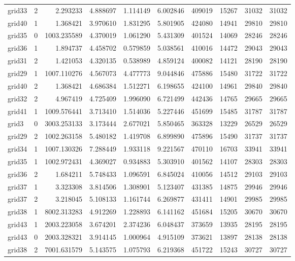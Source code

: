 \begin{longtable}{|l|r|r|r|r|r|r|r|r|r|}
grid33 & 2 & 2.293233 & 4.888697 & 1.114149 & 6.002846 & 409019 & 15267 & 31032 & 31032 \\
grid40 & 1 & 1.368421 & 3.970610 & 1.831295 & 5.801905 & 424080 & 14941 & 29810 & 29810 \\
grid35 & 0 & 1003.235589 & 4.370019 & 1.061290 & 5.431309 & 401524 & 14069 & 28246 & 28246 \\
grid36 & 1 & 1.894737 & 4.458702 & 0.579859 & 5.038561 & 410016 & 14472 & 29043 & 29043 \\
grid31 & 2 & 1.421053 & 4.320135 & 0.538989 & 4.859124 & 400082 & 14121 & 28190 & 28190 \\
grid29 & 1 & 1007.110276 & 4.567073 & 4.477773 & 9.044846 & 475886 & 15480 & 31722 & 31722 \\
grid40 & 2 & 1.368421 & 4.686384 & 1.512271 & 6.198655 & 424100 & 14961 & 29840 & 29840 \\
grid32 & 2 & 4.967419 & 4.725409 & 1.996090 & 6.721499 & 442436 & 14765 & 29665 & 29665 \\
grid41 & 1 & 1009.576441 & 3.713410 & 1.514036 & 5.227446 & 451699 & 15485 & 31787 & 31787 \\
grid3 & 0 & 3003.253133 & 3.173444 & 2.677021 & 5.850465 & 363328 & 13229 & 26529 & 26529 \\
grid29 & 2 & 1002.263158 & 5.480182 & 1.419708 & 6.899890 & 475896 & 15490 & 31737 & 31737 \\
grid34 & 1 & 1007.130326 & 7.288449 & 1.933118 & 9.221567 & 470110 & 16703 & 33941 & 33941 \\
grid35 & 1 & 1002.972431 & 4.369027 & 0.934883 & 5.303910 & 401562 & 14107 & 28303 & 28303 \\
grid36 & 2 & 1.684211 & 5.748433 & 1.096591 & 6.845024 & 410056 & 14512 & 29103 & 29103 \\
grid37 & 1 & 3.323308 & 3.814506 & 1.308901 & 5.123407 & 431385 & 14875 & 29946 & 29946 \\
grid37 & 2 & 3.218045 & 5.108133 & 1.161744 & 6.269877 & 431411 & 14901 & 29985 & 29985 \\
grid38 & 1 & 8002.313283 & 4.912269 & 1.228893 & 6.141162 & 451684 & 15205 & 30670 & 30670 \\
grid43 & 1 & 2003.223058 & 3.674201 & 2.374236 & 6.048437 & 373659 & 13935 & 28195 & 28195 \\
grid43 & 0 & 2003.328321 & 3.914145 & 1.000964 & 4.915109 & 373621 & 13897 & 28138 & 28138 \\
grid38 & 2 & 7001.631579 & 5.143575 & 1.075793 & 6.219368 & 451722 & 15243 & 30727 & 30727 \\

\end{longtable}
